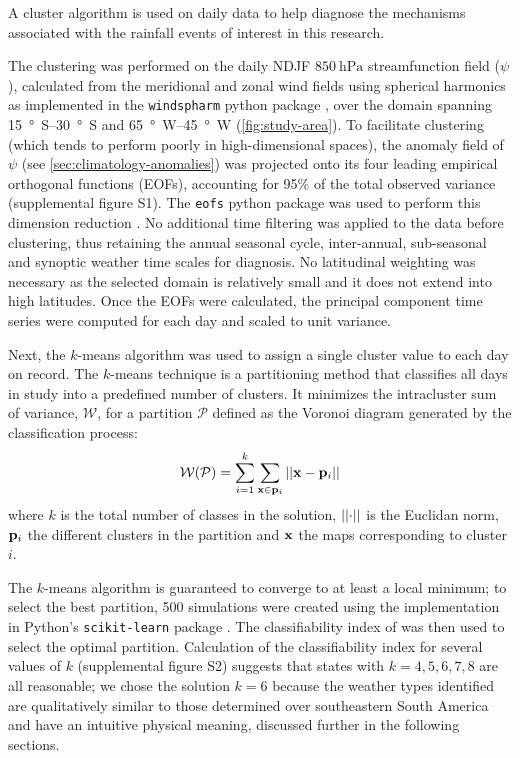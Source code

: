 \documentclass[twocol]{ametsoc}
\begin{document}
A cluster algorithm is used on daily data to help diagnose the mechanisms associated with the rainfall events of interest in this research.

The clustering was performed on the daily NDJF $\SI{850}{\hecto\pascal}$ streamfunction field ($\psi$), calculated from the meridional and zonal wind fields using spherical harmonics as implemented in the \texttt{windspharm} python package \citep{Dawson:2016ws}, over the domain spanning \SIrange{15}{30}{\degree S} and \SIrange{65}{45}{\degree W} (\cref{fig:study-area}).
To facilitate clustering (which tends to perform poorly in high-dimensional spaces), the anomaly field of $\psi$ (see \cref{sec:climatology-anomalies}) was projected  onto its four leading empirical orthogonal functions (EOFs), accounting for 95\% of the total observed variance (supplemental figure S1).
The \texttt{eofs} python package was used to perform this dimension reduction \citep{Dawson:2016ge}.
No additional time filtering was applied to the data before clustering, thus retaining the annual seasonal cycle, inter-annual, sub-seasonal and synoptic weather time scales for diagnosis.
No latitudinal weighting was necessary as the selected domain is relatively small and it does not extend into high latitudes.
Once the EOFs were calculated, the principal component time series were computed for each day and scaled to unit variance.

Next, the $k$-means algorithm was used to assign a single cluster value to each day on record.
The $k$-means technique is a partitioning method that classifies all days in study into a predefined number of clusters.
It minimizes the intracluster sum of variance, $\mathcal{W}$, for a partition $\mathcal{P}$ defined as the Voronoi diagram generated by the classification process:
\begin{equation}
	\mathcal{W} \qty( \mathcal{P} ) = \sum_{i=1}^{k}\sum_{\vb{x} \in \vb{p}_{i}} \abs{\abs{\vb{x} - \vb{p}_i}}
\end{equation}
where $k$ is the total number of classes in the solution, $\abs{\abs{\cdot}}$ is the Euclidan norm, $\vb{p}_i$ the different clusters in the partition and $\vb{x}$ the maps corresponding to cluster $i$.

The $k$-means algorithm is guaranteed to converge to at least a local minimum; to select the best partition, 500 simulations were created using the implementation in Python's \texttt{scikit-learn} package \citep{Pedregosa:2012tv}.
The classifiability index of \citet{Michelangeli1995} was then used to select the optimal partition.
Calculation of the classifiability index for several values of $k$ (supplemental figure S2) suggests that states with $k=4,5,6,7,8$ are all reasonable; we chose the solution $k=6$ because the weather types identified are qualitatively similar to those determined over southeastern South America \citep{Munoz2015,Munoz2016} and have an intuitive physical meaning, discussed further in the following sections.
\end{document}
